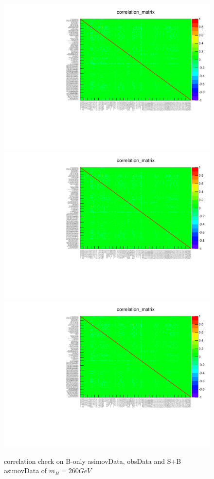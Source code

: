 \begin{figure}
\includegraphics[width=.4\textwidth, angle=-90]{fig/Statistical/combination/corr-exp-combined-mH260.pdf}
\includegraphics[width=.4\textwidth, angle=-90]{fig/Statistical/combination/corr-obs-combined-mH260.pdf}\\
\includegraphics[width=.4\textwidth, angle=-90]{fig/Statistical/combination/corr-exp-combined-mH260_mu1.pdf}
\caption{correlation check on B-only asimovData, obsData and S+B asimovData of $m_{H}=260 GeV$}
\label{fig:corr-comb-260}
\end{figure}

